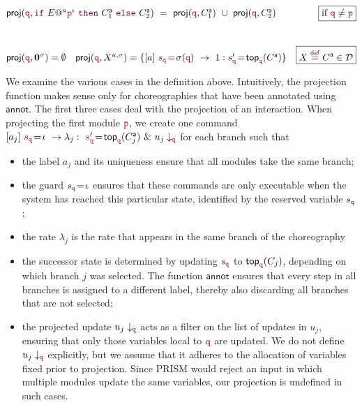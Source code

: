 \begin{defi}
\begin{displaymath}
\begin{array}{@{}lr@{}}
      \proj (\nrr,\ifTEl {E}a{\nr^\iota}{\anno C_1}{\anno C_2}) \ =\
      \proj (\nrr, \anno C_1)
      \ \cup\
      \proj (\nrr, \anno C_2)
      &  \boxed{\text{if }\nrr\neq\nr}
      \\[1cm]

      \proj (\nrr,\CEnd^{\sigma}) = \emptyset
      \quad
      \proj (\nrr, X^{a,\sigma}) =
      \{ \commandBase {a} {s_{\nrr}\!=\! \sigma(\nrr)}{\ 1: s'_{\nrr}\!=\! } \mathsf{top}_{\nrr}(\anno C)\}
      &\boxed{X\stackrel{\textcolor{sh_keyword}{\mathsf{def}}}{=}
        \anno C\in\defin}
    \end{array}
  \end{displaymath}
\end{defi}
We examine the various cases in the definition above. Intuitively, the
projection function makes sense only for choreographies that have been
annotated using $\mathsf{annot}$. The first three cases deal with the
projection of an interaction.
When projecting the first module $\nr$, we create one command
$\commandBase {a_j} {s_{\nrr}\!=\! \iota} {\lambda_j:\ s_{\role
    q}'\!=\!  \topannotation \nrr{\anno C_j}}\ \&\ \projE {u_j}{\nrr}$
for each branch such that
\begin{itemize}
\item the label $a_j$ and its uniqueness ensure that all modules take
  the same branch;
\item the guard $s_{\role q}\!=\! \iota$ ensures that these commands
  are only executable when the system has reached this particular
  state, identified by the reserved variable $s_{\role q}$;
\item the rate $\lambda_j$ is the rate that appears in the same branch
  of the choreography
\item the successor state is determined by updating $s_{\role q}$ to
  $\topannotation \nrr{C_j}$, depending on which branch $j$ was
  selected. %
  The function $\mathsf{annot}$ ensures that every step in all
  branches is assigned to a different label, thereby also discarding
  all branches that are not selected;
  
\item the projected update $\projE{u_j}{\nrr}$ acts as a filter on the
  list of updates in $u_j$, ensuring that only those variables local
  to $\role q$ are updated. 
  We do not define $\projE{u_j}{\nrr}$ explicitly, but we assume that
  it adheres to the allocation of variables fixed prior to projection.
  Since PRISM would reject an input in which multiple modules update
  the same variables, our projection is undefined in such cases.

\end{itemize}

